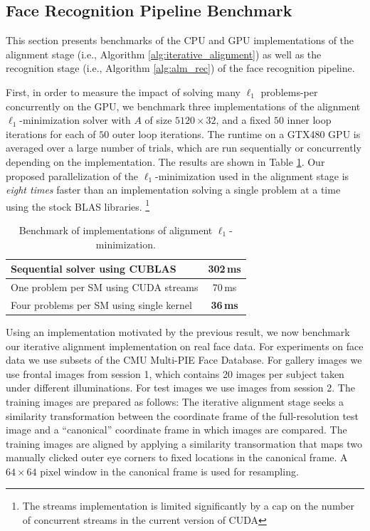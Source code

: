 \subsection{Face Recognition Pipeline Benchmark} 
\label{sec:benchmark}
This section presents benchmarks of the CPU and GPU implementations of the
alignment stage (i.e., Algorithm
\ref{alg:iterative_alignment}) as well as the recognition stage (i.e., Algorithm \ref{alg:alm_rec}) of the
face recognition pipeline.

First, in order to measure the impact of solving many
$\ell_1$ problems-per concurrently on the GPU, we benchmark three implementations of the
alignment $\ell_1$-minimization solver with $A$ of size $5120 \times 32$, and a fixed
$50$ inner loop iterations for each of $50$ outer loop iterations. The runtime
on a GTX480 GPU is averaged over a large number of trials, which are run
sequentially or concurrently depending on the implementation.
The results are shown in Table \ref{tbl:ubench}.
Our proposed parallelization of the $\ell_1$-minimization used in the alignment
stage is {\em eight times} faster than an implementation solving a single
problem at a time using the stock BLAS libraries.
\footnote{The streams implementation is limited significantly by a 
cap on the number of concurrent streams in the current version of CUDA}
\begin{table}[t!]
\caption{\small Benchmark of implementations of alignment $\ell_1$-minimization.}
\small
\begin{tabular}{|l|c|}
\hline
Sequential solver using CUBLAS & 302\,ms \\
\hline
One problem per SM using CUDA streams & 70\,ms  \\
\hline
Four problems per SM using single kernel & {\bf 36\,ms} \\
\hline
\end{tabular} 
\label{tbl:ubench}
\end{table}
 
Using an implementation motivated by the previous result, we now benchmark our
iterative alignment implementation on real face data.  For experiments on face
data we use subsets of the CMU Multi-PIE Face Database.  For gallery images we
use frontal images from session 1, which contains 20 images per subject taken
under different illuminations. For test images we use images from session 2.
The training images are prepared as follows: The iterative alignment stage
seeks a similarity transformation between the coordinate frame of the
full-resolution test image and a ``canonical'' coordinate frame in which images
are compared.  The training images are aligned by applying a similarity
transormation that maps two manually clicked outer eye corners to fixed
locations in the canonical frame.  A $64 \times 64$
pixel window in the canonical frame is used for resampling. 

